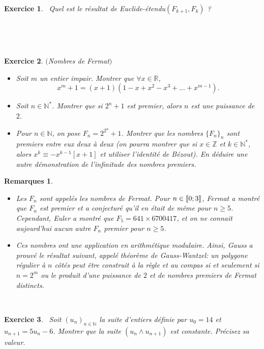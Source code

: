 \documentclass[11pt,a4paper]{article}
\newtheorem{ex}{Exercice}
\newtheorem*{rem2}{Remarques}
\newcommand{\N}{\mathbb{N}}
\newcommand{\Z}{\mathbb{Z}}
\begin{document}
\begin{ex}\label{exEuclide_etendu_fibonnacci}\
Quel est le résultat de Euclide-étendu$(F_{k+1},F_k)$ ?
\end{ex}

\


\

\begin{ex}\label{exNombres_Fermat}$($Nombres de Fermat$)$
\begin{itemize}
\item[$1.$] Soit $m$ un entier impair. Montrer que $\forall x \in \mathbb{R}$, 
$$ x^m+1=(x+1)(1-x+x^2-x^3+\ldots + x^{m-1}).$$
\item[$2.$] Soit $n \in \mathbb{N}^*$. Montrer que si $2^n+1$ est premier, alors $n$ est une puissance de $2$.%
\item[$3.$] Pour $n \in \mathbb{N}$, on pose $F_n=2^{2^{n}}+1$. Montrer que les nombres $\{ F_n \}_n$ sont premiers entre eux deux à deux (on pourra montrer que si $x\in \Z$ et $k\in \N^*$, alors $x^k\equiv -x^{k-1} [x+1]$ et utiliser l'identité de Bézout). En déduire une autre  démonstration de l'infinitude des nombres premiers. 
\end{itemize}
\end{ex}

\begin{rem2}\
\begin{itemize}
\item[•]Les $F_n$ sont appelés les nombres de Fermat. Pour $n \in \llbracket 0;3 \rrbracket $, Fermat a montré que $F_n$ est premier et a conjecturé qu'il en était de même pour $n \geqslant 5$. Cependant, Euler a montré que $F_5=641 \times 6700417$, et on ne connait aujourd'hui aucun autre $F_n$ premier pour $n \geqslant 5$.
\item[•]Ces nombres ont une application en arithmétique modulaire. Ainsi, Gauss a prouvé le résultat suivant, appelé théorème de Gauss-Wantzel: un polygone régulier à $n$ côtés peut être construit à la règle et au compas si et seulement si $n=2^m$ ou le produit d'une puissance de $2$ et de nombres premiers de Fermat distincts. 
\end{itemize} 
\end{rem2}


\


\begin{ex}\label{exPGCD_suite}\
Soit $(u_n)_{n \in \mathbb{N}}$ la suite d'entiers définie par $u_0=14$ et $u_{n+1}=5 u_n -6$. Montrer que la suite $(u_n\wedge u_{n+1})$ est constante. Précisez sa valeur.
\end{ex}
\end{document}
